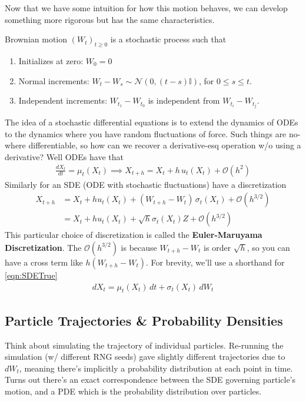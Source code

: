 Now that we have some intuition for how this motion behaves, we can develop something more rigorous but has the same characteristics.
\begin{definition}
	 Brownian motion $(W_t)_{t\geq 0}$ is a stochastic process such that
	\begin{enumerate}
		\item Initializes at zero: $W_0 = 0$
		\item Normal increments: $W_t - W_s \sim \mathcal N(0,(t-s) \mathbb I)$, for $ 0 \leq s \leq t$.
		\item Independent increments: $W_{t_1} - W_{t_0}$ is independent from $W_{t_i} - W_{t_j}$.
	\end{enumerate}
\end{definition}
The idea of a stochastic differential equations is to extend the dynamics of ODEs to the dynamics where you have random fluctuations of force. Such things are no-where differentiable, so how can we recover a derivative-esq operation w/o using a derivative? Well ODEs  have that
\begin{align}
	\frac{dX_t}{dt} = \mu_t(X_t) \implies X_{t+h} = X_t + h\, u_t(X_t) + \mathcal O(h^2)
\end{align}
Similarly for an SDE (ODE with stochastic fluctuations) have a discretization
\begin{align}
	X_{t+h} & = X_t + h u_t(X_t)  + (W_{t+h} - W_t) \, \sigma_t(X_t) + \mathcal O(h^{3/2}) \label{eqn:SDETrue}\\
	& = X_t  + h u_t(X_t)  + \sqrt{h} \sigma_t(X_t) Z + \mathcal O(h^{3/2})
\end{align}
This particular choice of discretization is called the \textbf{Euler-Maruyama Discretization}.
The $\mathcal O(h^{3/2})$ is because $W_{t+h} - W_t$ is order $\sqrt{h}$, so you can have a cross term like $h (W_{t+h} - W_t)$. For brevity, we'll use a shorthand for \ref{eqn:SDETrue}
\begin{align}
	dX_t = \mu_t(X_t) \, dt + \sigma_t(X_t)\, dW_t
\end{align}

\subsection{Particle Trajectories \& Probability Densities}
Think about simulating the trajectory of individual particles. Re-running the simulation (w/ different RNG seeds) gave slightly different trajectories due to $dW_t$, meaning there's implicitly a probability distribution at each point in time. Turns out there's an exact correspondence between the SDE governing particle's motion, and a PDE which is the probability distribution over particles.

